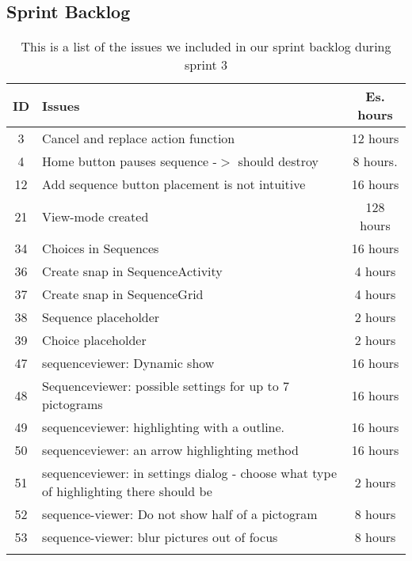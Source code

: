 \subsection{Sprint Backlog}\label{subsec:spr3_sprblog}
\begin{longtable} { | c | p{12cm} | c | } 
\hline
	ID 	&	Issues	&	Es. hours  \\\hline
	3	& 	Cancel and replace action function	&	12 hours \\\hline
	4	&	Home button pauses sequence -$>$ should destroy	&	8 hours.	\\\hline
	12	& 	Add sequence button placement is not intuitive	&	16 hours 	\\\hline
	21	& 	View-mode created				&	128 hours	\\\hline
	34	&	Choices in Sequences				& 	16 hours  \\\hline
	36	& 	Create snap in SequenceActivity		&	4 hours  \\\hline
	37	&	Create snap in SequenceGrid		& 	4 hours \\\hline
	38	& 	Sequence placeholder 			&	2 hours\\\hline
	39	&	Choice placeholder		 		&	2 hours \\\hline
	47	&	sequenceviewer: Dynamic show	 	&	16 hours \\\hline
	48	&	Sequenceviewer: possible settings for up to 7 pictograms	 & 	16 hours	\\\hline
	49	&	sequenceviewer: highlighting with a outline.	  &	16 hours \\\hline
	50	&	sequenceviewer: an arrow highlighting method	 &	16 hours \\\hline
	51	&	sequenceviewer: in settings dialog - choose what type of highlighting there should be	 &	2 hours \\\hline
	52	&	sequence-viewer: Do not show half of a pictogram	&	8 hours	\\\hline
	53	&	sequence-viewer: blur pictures out of focus		 &	8 hours \\\hline
\caption{This is a list of the issues we included in our sprint backlog during sprint 3}
\label{tab:spr3_sprintblog}
\end{longtable}